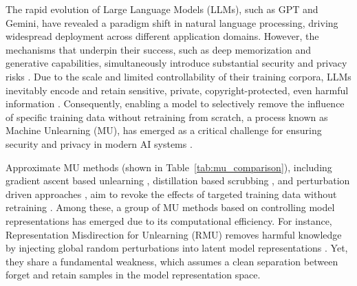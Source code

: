 

The rapid evolution of Large Language Models (LLMs), such as GPT and Gemini, have revealed a paradigm shift in natural language processing, driving widespread deployment across different application domains. 
However, the mechanisms that underpin their success, such as deep memorization and generative capabilities, simultaneously introduce substantial security and privacy risks \cite{liu2024jailbreak}. Due to the scale and limited controllability of their training corpora, LLMs inevitably encode and retain sensitive, private, copyright-protected, even harmful information \cite{vulchi2024exploring}. Consequently, enabling a model to selectively remove the influence of specific training data without retraining from scratch, a process known as Machine Unlearning (MU), has emerged as a critical challenge for ensuring security and privacy in modern AI systems \cite{liu2024survey,nguyen2025survey,shaik2024exploring}.

Approximate MU methods (shown in Table~\ref{tab:mu_comparison}), including gradient ascent based unlearning \cite{jang2023knowledge,yao2024machine}, distillation based scrubbing \cite{dong2025undial,wang2025balancing}, and perturbation driven approaches \cite{10.1609/aaai.v39i22.34544,pmlr-v235-li24bc}, aim to revoke the effects of targeted training data without retraining \cite{geng2025comprehensive,yan2022arcane}. Among these, a group of MU methods based on controlling model representations has emerged due to its computational efficiency. For instance, Representation Misdirection for Unlearning (RMU) removes harmful knowledge by injecting global random perturbations into latent model representations \cite{pmlr-v235-li24bc}. Yet, they share a fundamental weakness, which assumes a clean separation between forget and retain samples in the model representation space. 

